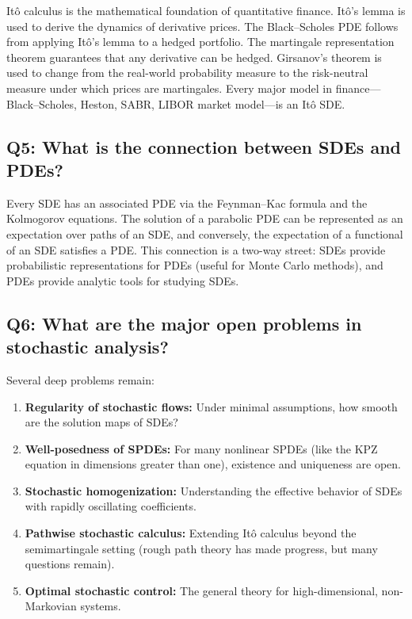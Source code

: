 It\^{o} calculus is the mathematical foundation of quantitative finance. It\^{o}'s lemma is used to derive the dynamics of derivative prices. The Black--Scholes PDE follows from applying It\^{o}'s lemma to a hedged portfolio. The martingale representation theorem guarantees that any derivative can be hedged. Girsanov's theorem is used to change from the real-world probability measure to the risk-neutral measure under which prices are martingales. Every major model in finance---Black--Scholes, Heston, SABR, LIBOR market model---is an It\^{o} SDE.

\subsection*{Q5: What is the connection between SDEs and PDEs?}

Every SDE has an associated PDE via the Feynman--Kac formula and the Kolmogorov equations. The solution of a parabolic PDE can be represented as an expectation over paths of an SDE, and conversely, the expectation of a functional of an SDE satisfies a PDE. This connection is a two-way street: SDEs provide probabilistic representations for PDEs (useful for Monte Carlo methods), and PDEs provide analytic tools for studying SDEs.

\subsection*{Q6: What are the major open problems in stochastic analysis?}

Several deep problems remain:
\begin{enumerate}
    \item \textbf{Regularity of stochastic flows:} Under minimal assumptions, how smooth are the solution maps of SDEs?
    \item \textbf{Well-posedness of SPDEs:} For many nonlinear SPDEs (like the KPZ equation in dimensions greater than one), existence and uniqueness are open.
    \item \textbf{Stochastic homogenization:} Understanding the effective behavior of SDEs with rapidly oscillating coefficients.
    \item \textbf{Pathwise stochastic calculus:} Extending It\^{o} calculus beyond the semimartingale setting (rough path theory has made progress, but many questions remain).
    \item \textbf{Optimal stochastic control:} The general theory for high-dimensional, non-Markovian systems.
\end{enumerate}


